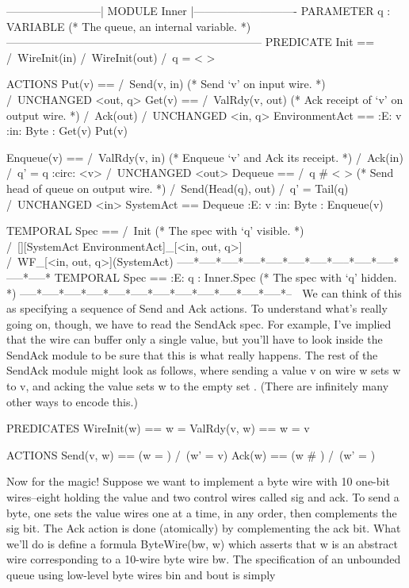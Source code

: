 \begin{spec}
    --------------------------| MODULE Inner |----------------------------
    PARAMETER
      q : VARIABLE  (* The queue, an internal variable. *)
    ---------------------------------------------------------------------   
    PREDICATE
      Init == /\ WireInit(in) /\ WireInit(out) 
              /\ q = < >
  
    ACTIONS
      Put(v) == /\ Send(v, in)          (* Send `v' on input wire.            *)
                /\ UNCHANGED <out, q>
      Get(v) == /\ ValRdy(v, out)       (* Ack receipt of `v' on output wire. *)
                /\ Ack(out)
                /\ UNCHANGED <in, q>
      EnvironmentAct == :E: v :in: Byte : Get(v) \/ Put(v)
  
      Enqueue(v) ==  /\ ValRdy(v, in)   (* Enqueue `v' and Ack its receipt.  *)
                     /\ Ack(in)
                     /\ q' = q :circ: <v>
                     /\ UNCHANGED <out>
      Dequeue == /\ q # < >             (* Send head of queue on output wire. *)
                 /\ Send(Head(q), out) 
                 /\ q' = Tail(q)
                 /\ UNCHANGED <in>
      SystemAct == Dequeue \/ :E: v :in: Byte : Enqueue(v)
  
    TEMPORAL    
      Spec == /\ Init                   (* The spec with `q' visible. *)
\\            /\ [][SystemAct \/ EnvironmentAct]_[<in, out, q>]
\\            /\ WF_[<in, out, q>](SystemAct)
    -----*-----*-----*-----*-----*-----*-----*-----*-----*-----*-----*-----*
  TEMPORAL
    Spec  == :E: q : Inner.Spec  (* The spec with `q' hidden. *)
  -----*-----*-----*-----*-----*-----*-----*-----*-----*-----*-----*-----*--

We can think of this as specifying a sequence of Send and Ack
actions.  To understand what's really going on, though, we have to
read the SendAck spec.  For example, I've implied that the wire can
buffer only a single value, but you'll have to look inside the
SendAck module to be sure that this is what really happens.  The
rest of the SendAck module might look as follows, where sending a
value v on wire w sets w to {v}, and acking the value sets w to the
empty set {}.  (There are infinitely many other ways to encode
this.)

  PREDICATES
    WireInit(w)  ==  w = {}
    ValRdy(v, w) ==  w = {v}

  ACTIONS       
    Send(v, w)  ==  (w = {}) /\ (w' = {v})
    Ack(w)      ==  (w # {}) /\ (w' = {})


Now for the magic! Suppose we want to implement a byte wire with 10
one-bit wires--eight holding the value and two control wires called
sig and ack.  To send a byte, one sets the value wires one at a
time, in any order, then complements the sig bit.  The Ack action is
done (atomically) by complementing the ack bit.  What we'll do is
define a formula ByteWire(bw, w) which asserts that w is an abstract
wire corresponding to a 10-wire byte wire bw.  The specification of
an unbounded queue using low-level byte wires bin and bout is simply


\end{spec}
